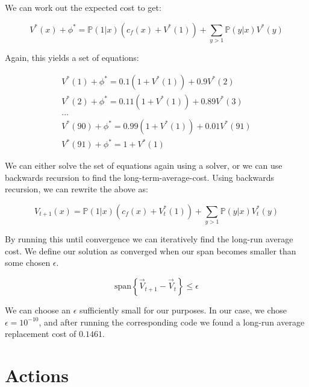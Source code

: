 \documentclass{uniarticle}
\begin{document}
We can work out the expected cost to get:

\begin{equation}\label{eq:poisson}
    V^*(x) + \phi^* = \mathbb{P} \left(1 | x \right) \left(c_f(x) + V^*(1)
        \right) + \sum_{y > 1} \mathbb{P} \left(y | x \right) V^*(y)
\end{equation}

Again, this yields a set of equations:

\begin{equation}\label{eq:poisson-equations}
  \begin{gathered}
    V^*(1) + \phi^* = 0.1 \left(1 + V^*(1)\right) + 0.9 V^*(2) \\
    V^*(2) + \phi^* = 0.11 \left(1 + V^*(1)\right) + 0.89 V^*(3) \\
    \text{...} \\
    V^*(90) + \phi^* = 0.99 \left(1 + V^*(1)\right) + 0.01 V^*(91) \\
    V^*(91) + \phi^* = 1 + V^*(1)
  \end{gathered}
\end{equation}

We can either solve the set of equations again using a solver, or we can use backwards
recursion to find the long-term-average-cost.
Using backwards recursion, we can rewrite the above as:

\begin{equation}\label{eq:poisson-recursion}
    V_{t+1}(x) = \mathbb{P} \left(1 | x \right) \left(c_f(x) + V_t^*(1)
        \right) + \sum_{y > 1} \mathbb{P} \left(y | x \right) V_t^*(y)
\end{equation}

By running this until convergence we can iteratively find the long-run
average cost. We define our solution as converged when our span becomes
smaller than some
chosen $\epsilon$.

\begin{equation}\label{eq:convergence}
    \text{span}\left\{\vec{V}_{t+1} - \vec{V}_t \right\} \le \epsilon
\end{equation}

We can choose an $\epsilon$ sufficiently small for our purposes. In our
case, we chose $\epsilon = 10^{-10}$, and after running the corresponding code we found a
long-run average replacement cost of $0.1461$.

\section{Actions}
\end{document}
